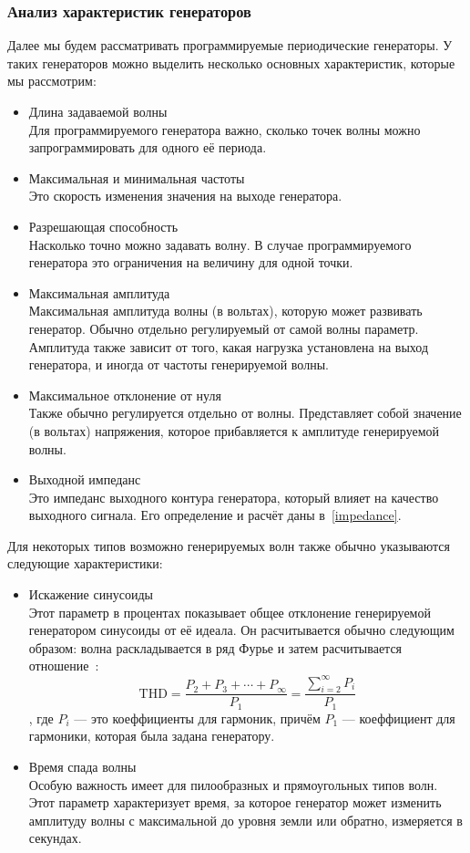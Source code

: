 \documentclass[a4paper,12pt]{report}
\numberwithin{equation}{section}
\begin{document}
\subsubsection{Анализ характеристик генераторов}
Далее мы будем рассматривать программируемые периодические генераторы. У таких
генераторов можно выделить несколько основных характеристик, которые мы
рассмотрим:
\begin{itemize}
\item Длина задаваемой волны \\
Для программируемого генератора важно, сколько точек волны можно
запрограммировать для одного её периода. 
\item Максимальная и минимальная частоты \\
Это скорость изменения значения на выходе генератора.
\item Разрешающая способность \\
Насколько точно можно задавать волну. В случае программируемого генератора это
ограничения на величину для одной точки.
\item Максимальная амплитуда \\
Максимальная амплитуда волны (в вольтах), которую может развивать
генератор. Обычно отдельно регулируемый от самой волны параметр. Амплитуда также
зависит от того, какая нагрузка установлена на выход генератора, и иногда от
частоты генерируемой волны.
\item Максимальное отклонение от нуля \\
Также обычно регулируется отдельно от волны. Представляет собой значение (в
вольтах) напряжения, которое прибавляется к амплитуде генерируемой волны.
\item Выходной импеданс \\
Это импеданс выходного контура генератора, который влияет на качество выходного
сигнала. Его определение и расчёт даны в~\ref{impedance}.
\end{itemize}
Для некоторых типов возможно генерируемых волн также обычно указываются
следующие характеристики:
\begin{itemize}
\item Искажение синусоиды \\
Этот параметр в процентах показывает общее отклонение генерируемой генератором
синусоиды от её идеала. Он расчитывается обычно следующим образом: волна
раскладывается в ряд Фурье и затем расчитывается
отношение~\cite{slone2001audiophile}:
\begin{equation}
\text{THD} = \frac{P_2 + P_3 + \cdots + P_\infty}{P_1} = \frac{\sum_{i=2}^\infty
  P_i}{P_1}
\end{equation}
, где $P_i$ --- это коеффициенты для гармоник, причём $P_1$ --- коеффициент для
гармоники, которая была задана генератору.
\item Время спада волны \\
Особую важность имеет для пилообразных и прямоугольных типов волн. Этот параметр
характеризует время, за которое генератор может изменить амплитуду волны с
максимальной до уровня земли или обратно, измеряется в секундах.
\end{itemize}
\end{document}
